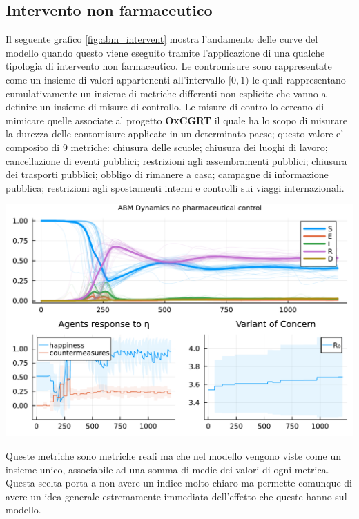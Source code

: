 \subsection{Intervento non farmaceutico}
Il seguente grafico \ref{fig:abm_intervent} mostra l'andamento delle curve del modello
quando questo viene eseguito tramite l'applicazione di una qualche tipologia di intervento non farmaceutico. 
Le contromisure sono rappresentate come un insieme di valori appartenenti all'intervallo $[0, 1)$ 
le quali rappresentano cumulativamente un insieme di metriche differenti non esplicite che vanno a definire 
un insieme di misure di controllo. Le misure di controllo cercano di mimicare quelle associate al progetto 
\textbf{OxCGRT} il quale ha lo scopo di misurare la durezza delle contomisure applicate in un determinato paese; 
questo valore e' composito di 9 metriche: chiusura delle scuole; chiusura dei luoghi di lavoro; 
cancellazione di eventi pubblici; restrizioni agli assembramenti pubblici; 
chiusura dei trasporti pubblici; obbligo di rimanere a casa; campagne di informazione pubblica; 
restrizioni agli spostamenti interni e controlli sui viaggi internazionali.

\begin{minipage}{\linewidth}
	\centering
	\includegraphics[width=\textwidth]{img/SocialNetworkABM_CONTROL.pdf}
	\label{fig:abm_intervent}
\end{minipage}

Queste metriche sono metriche reali ma che nel modello vengono viste come un insieme unico, associabile 
ad una somma di medie dei valori di ogni metrica. Questa scelta porta a non avere un indice molto chiaro
ma permette comunque di avere un idea generale estremamente immediata dell'effetto che queste hanno sul modello.

